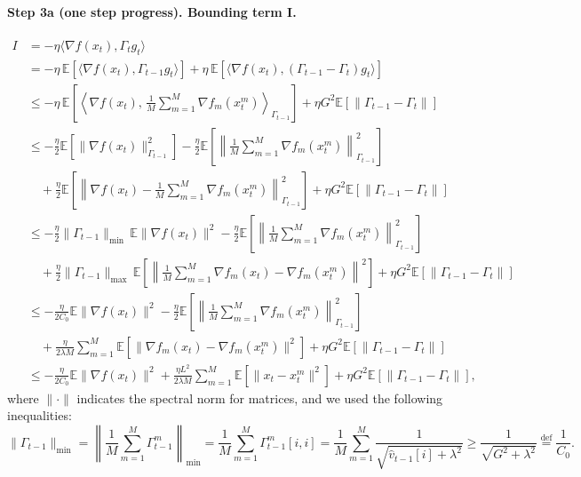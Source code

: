 \paragraph{Step 3a (one step progress). Bounding term I.}
\begin{align*}
I &= -\eta\langle \nabla f(x_t), \Gamma_t g_t \rangle \\
&= -\eta\,\mathbb{E}\!\left[\langle \nabla f(x_t), \Gamma_{t-1} g_t \rangle\right]
   + \eta\,\mathbb{E}\!\left[\langle \nabla f(x_t), (\Gamma_{t-1}-\Gamma_t) g_t \rangle\right] \\
&\leq -\eta\,\mathbb{E}\!\left[\left\langle \nabla f(x_t),\, \frac{1}{M}\sum_{m=1}^{M}\nabla f_m(x_t^m) \right\rangle_{\!\Gamma_{t-1}}\right]
   + \eta G^2 \mathbb{E}[\|\Gamma_{t-1}-\Gamma_t\|] \\
&\leq -\frac{\eta}{2}\mathbb{E}\!\left[\|\nabla f(x_t)\|_{\Gamma_{t-1}}^2\right]
   - \frac{\eta}{2}\mathbb{E}\!\left[\left\|\frac{1}{M}\sum_{m=1}^{M}\nabla f_m(x_t^m)\right\|_{\Gamma_{t-1}}^2\right] \\
&\quad + \frac{\eta}{2}\mathbb{E}\!\left[\left\|\nabla f(x_t) - \frac{1}{M}\sum_{m=1}^{M}\nabla f_m(x_t^m)\right\|_{\Gamma_{t-1}}^2\right]
   + \eta G^2 \mathbb{E}[\|\Gamma_{t-1}-\Gamma_t\|] \\
&\leq -\frac{\eta}{2}\|\Gamma_{t-1}\|_{\min}\,\mathbb{E}\|\nabla f(x_t)\|^2
   - \frac{\eta}{2}\mathbb{E}\!\left[\left\|\frac{1}{M}\sum_{m=1}^{M}\nabla f_m(x_t^m)\right\|_{\Gamma_{t-1}}^2\right] \\
&\quad + \frac{\eta}{2}\|\Gamma_{t-1}\|_{\max}\,\mathbb{E}\!\left[\left\|\frac{1}{M}\sum_{m=1}^{M}\nabla f_m(x_t) - \nabla f_m(x_t^m)\right\|^2\right]
   + \eta G^2 \mathbb{E}[\|\Gamma_{t-1}-\Gamma_t\|] \\
&\leq -\frac{\eta}{2C_0}\mathbb{E}\|\nabla f(x_t)\|^2
   - \frac{\eta}{2}\mathbb{E}\!\left[\left\|\frac{1}{M}\sum_{m=1}^{M}\nabla f_m(x_t^m)\right\|_{\Gamma_{t-1}}^2\right] \\
&\quad + \frac{\eta}{2\lambda M}\sum_{m=1}^{M}\mathbb{E}\!\left[\|\nabla f_m(x_t) - \nabla f_m(x_t^m)\|^2\right]
   + \eta G^2 \mathbb{E}[\|\Gamma_{t-1}-\Gamma_t\|] \\
&\leq -\frac{\eta}{2C_0}\mathbb{E}\|\nabla f(x_t)\|^2
   + \frac{\eta L^2}{2\lambda M}\sum_{m=1}^{M}\mathbb{E}\!\left[\|x_t - x_t^m\|^2\right]
   + \eta G^2 \mathbb{E}[\|\Gamma_{t-1}-\Gamma_t\|],
\end{align*}
where $\|\cdot\|$ indicates the spectral norm for matrices, and we used the following inequalities:
\[
\|\Gamma_{t-1}\|_{\min}
= \left\|\frac{1}{M}\sum_{m=1}^{M}\Gamma_{t-1}^m\right\|_{\min}
= \frac{1}{M}\sum_{m=1}^{M}\Gamma_{t-1}^m[i,i]
= \frac{1}{M}\sum_{m=1}^{M}\frac{1}{\sqrt{\hat{v}_{t-1}[i]+\lambda^2}}
\geq \frac{1}{\sqrt{G^2+\lambda^2}}
\stackrel{\text{def}}{=} \frac{1}{C_0}.
\]

